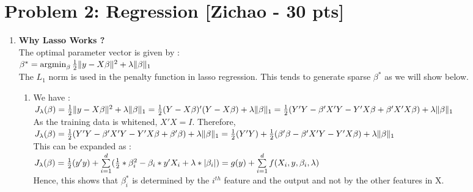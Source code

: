 \section*{Problem 2: Regression [Zichao - 30 pts]}

\begin{enumerate}
	\item{
	\textbf{Why Lasso Works ?}\\
	
	The optimal parameter vector is given by :\\	

	$\beta^{*} = \operatorname*{\mathrm{argmin}}_{\beta}  \frac{1}{2} \| y - X\beta \|^{2} + \lambda \| \beta \|_{1}$\\
	
	The $L_{1}$ norm is used in the penalty function in lasso regression. This tends to generate sparse $\beta^{*}$ as we will show below.
	
	\begin{enumerate}	
	\item{
	We have :\\
		
		$J_{\lambda}(\beta) = \frac{1}{2} \| y - X\beta \|^{2} + \lambda \| \beta \|_{1} \\
		=  \frac{1}{2} ( Y - X\beta)'(Y - X\beta) + \lambda \| \beta \|_{1} \\
		=  \frac{1}{2} ( Y'Y - \beta'X'Y - Y'X\beta + \beta'X'X\beta)  + \lambda \| \beta \|_{1}$\\
		
	As the training data is whitened, $X'X = I$. Therefore,\\
		
		$J_{\lambda}(\beta) =  \frac{1}{2} ( Y'Y - \beta'X'Y - Y'X\beta + \beta'\beta) + \lambda \| \beta \|_{1} \\
		= \frac{1}{2} (Y'Y) + \frac{1}{2} (\beta'\beta - 	\beta'X'Y - Y'X\beta ) +  \lambda \| \beta \|_{1} $\\
		
	This can be expanded as : \\
	
		$J_{\lambda}(\beta) = \frac{1}{2} (y'y) + \sum\limits_{i=1}^d ( \frac{1}{2} * \beta_{i}^{2} - \beta_{i} * y'X_{i} + \lambda * |\beta_{i}|) \\
		= g(y) + \sum\limits_{i=1}^d f(X_{i},y,\beta_{i},\lambda) $\\
	
	Hence, this shows that $\beta_{i}^{*}$ is determined by the $i^{th}$ feature and the output and not by the other features in X.		
	}		
	

\end{enumerate}}
\end{enumerate}
